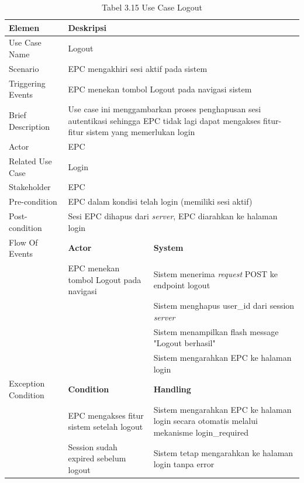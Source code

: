 \begin{longtable}{|p{3.5cm}|p{4.5cm}|p{5cm}|}
\caption{Tabel 3.15 Use Case Logout} \label{table:tab3.15} \\
\hline
\textbf{Elemen} & \multicolumn{2}{p{\ucdeskcol}|}{\textbf{Deskripsi}} \\
\hline
\endfirsthead
\endhead
\hline
\endfoot
Use Case Name & \multicolumn{2}{p{\ucdeskcol}|}{Logout} \\
\hline
Scenario & \multicolumn{2}{p{\ucdeskcol}|}{EPC mengakhiri sesi aktif pada sistem} \\
\hline
Triggering Events & \multicolumn{2}{p{\ucdeskcol}|}{EPC menekan tombol Logout pada navigasi sistem} \\
\hline
Brief Description & \multicolumn{2}{p{\ucdeskcol}|}{Use case ini menggambarkan proses penghapusan sesi autentikasi sehingga EPC tidak lagi dapat mengakses fitur-fitur sistem yang memerlukan login} \\
\hline
Actor & \multicolumn{2}{p{\ucdeskcol}|}{EPC} \\
\hline
Related Use Case & \multicolumn{2}{p{\ucdeskcol}|}{Login} \\
\hline
Stakeholder & \multicolumn{2}{p{\ucdeskcol}|}{EPC} \\
\hline
Pre-condition & \multicolumn{2}{p{\ucdeskcol}|}{EPC dalam kondisi telah login (memiliki sesi aktif)} \\
\hline
Post-condition & \multicolumn{2}{p{\ucdeskcol}|}{Sesi EPC dihapus dari \textit{server}, EPC diarahkan ke halaman login} \\
\hline
Flow Of Events & \textbf{Actor} & \textbf{System} \\
\hline
 & EPC menekan tombol Logout pada navigasi & Sistem menerima \textit{request} POST ke endpoint logout \\
\hline
 & & Sistem menghapus user\_id dari session \textit{server} \\
\hline
 & & Sistem menampilkan flash message "Logout berhasil" \\
\hline
 & & Sistem mengarahkan EPC ke halaman login \\
\hline
Exception Condition & \textbf{Condition} & \textbf{Handling} \\
\hline
 & EPC mengakses fitur sistem setelah logout & Sistem mengarahkan EPC ke halaman login secara otomatis melalui mekanisme login\_required \\
\hline
 & Session sudah expired sebelum logout & Sistem tetap mengarahkan ke halaman login tanpa error \\
\hline
\end{longtable}

